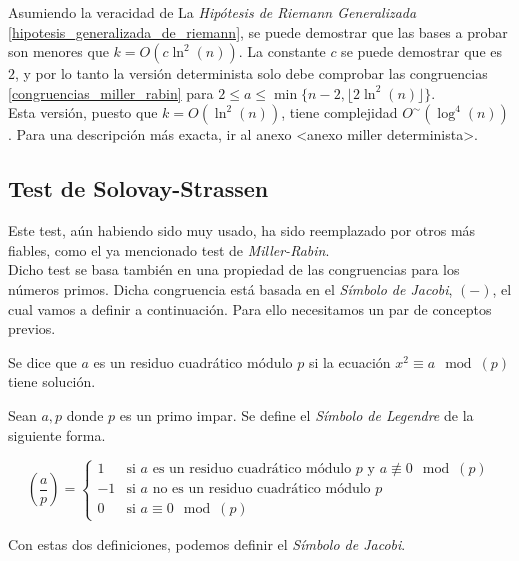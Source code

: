 Asumiendo la veracidad de La \textit{Hipótesis de Riemann Generalizada} \autoref{hipotesis_generalizada_de_riemann}, se puede demostrar que las bases a probar son menores que $k = O(c\ln^2(n))$. La constante $c$ se puede demostrar que es $2$, y por lo tanto la versión determinista solo debe comprobar las congruencias \eqref{congruencias_miller_rabin} para $2 \leq a \leq \min\{n-2, \lfloor 2\ln^2(n) \rfloor\}$.\\

Esta versión, puesto que $k = O(\ln^2(n))$, tiene complejidad $O^\sim(\log^4(n))$. Para una descripción más exacta, ir al anexo <anexo miller determinista>.

\subsection{Test de Solovay-Strassen}

Este test, aún habiendo sido muy usado, ha sido reemplazado por otros más fiables, como el ya mencionado test de \textit{Miller-Rabin}.\\

Dicho test se basa también en una propiedad de las congruencias para los números primos. Dicha congruencia está basada en el \textit{Símbolo de Jacobi}, $(-)$, el cual vamos a definir a continuación. Para ello necesitamos un par de conceptos previos.

\begin{definicion}
	Se dice que $a$ es un residuo cuadrático módulo $p$ si la ecuación $x^2 \equiv a \mod(p)$ tiene solución.
\end{definicion}

\begin{definicion}\label{simbolo_de_legendre}
	Sean $a, p$ donde $p$ es un primo impar. Se define el \textit{Símbolo de Legendre} de la siguiente forma.
	
	\begin{equation}
	\left(\frac{a}{p}\right) =
	\begin{cases}
		1 &\text{si $a$ es un residuo cuadrático módulo $p$ y $a \not\equiv 0 \mod(p)$}\\
		-1 &\text{si $a$ no es un residuo cuadrático módulo $p$}\\
		0 &\text{si $a \equiv 0 \mod(p)$}
	\end{cases}
	\end{equation}
\end{definicion}

Con estas dos definiciones, podemos definir el \textit{Símbolo de Jacobi}.

